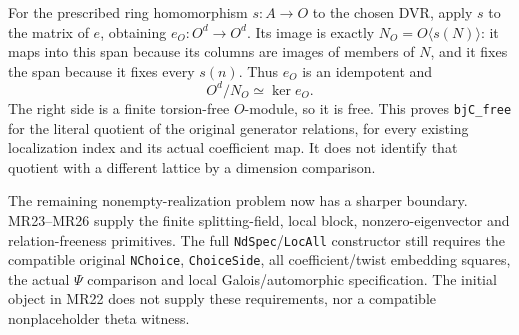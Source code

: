 For the prescribed ring homomorphism $s:A\to O$ to the chosen
DVR, apply $s$ to the matrix of $e$, obtaining $e_O:O^d\to O^d$.
Its image is exactly
$N_O=O\langle s(N)\rangle$: it maps into this span because
its columns are images of members of $N$, and it fixes the
span because it fixes every $s(n)$. Thus $e_O$ is an
idempotent and
\[
                 O^d/N_O\simeq\ker e_O.              \tag{MR.40}
\]
The right side is a finite torsion-free $O$-module, so it is
free. This proves \texttt{bjC\_free} for the literal quotient
of the original generator relations, for every existing
localization index and its actual coefficient map. It does not
identify that quotient with a different lattice by a dimension
comparison.

The remaining nonempty-realization problem now has a sharper
boundary. MR23--MR26 supply the finite splitting-field, local
block, nonzero-eigenvector and relation-freeness primitives.
The full \texttt{NdSpec}/\texttt{LocAll} constructor still
requires the compatible original \texttt{NChoice},
\texttt{ChoiceSide}, all coefficient/twist embedding squares,
the actual $\Psi$ comparison and local Galois/automorphic
specification. The initial object in MR22 does not supply these
requirements, nor a compatible nonplaceholder theta witness.


